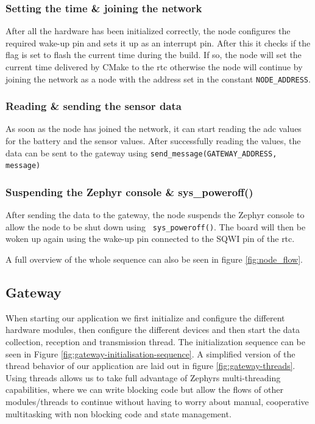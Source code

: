 \subsubsection{Setting the time \& joining the network}
After all the hardware has been initialized correctly, the node configures the required wake-up pin and sets it up as an interrupt pin. After this it checks if the flag is set to flash the current time during the build. If so, the node will set the current time delivered by CMake to the rtc otherwise the node will continue by joining the network as a node with the address set in the constant \texttt{NODE\_ADDRESS}.

\subsubsection{Reading \& sending the sensor data}
As soon as the node has joined the network, it can start reading the adc values for the battery and the sensor values.
After successfully reading the values, the data can be sent to the gateway using \texttt{send\_message(GATEWAY\_ADDRESS, message)}

\subsubsection{Suspending the Zephyr console \& sys\_poweroff()}
After sending the data to the gateway, the node suspends the Zephyr console to allow the node to be shut down using \texttt{ sys\_poweroff()}. The board will then be woken up again using the wake-up pin connected to the SQWI pin of the rtc. 

A full overview of the whole sequence can also be seen in figure \ref{fig:node_flow}.

\subsection{Gateway}

When starting our application we first initialize and configure the different hardware modules, then configure the different devices and then start the data collection, reception and transmission thread.
The initialization sequence can be seen in Figure \ref{fig:gateway-initialisation-sequence}. A simplified version of the thread behavior of our application are laid out in figure \ref{fig:gateway-threads}.
Using threads allows us to take full advantage of Zephyrs multi-threading capabilities, where we can write blocking code but allow the flows of other modules/threads to continue without having to worry about manual, cooperative multitasking with non blocking code and state management.

